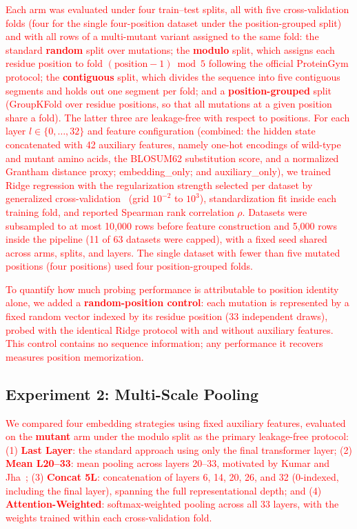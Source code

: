 \documentclass[numbered,webpdf,modern,large]{oup-authoring-template}
\newcommand{\rev}[1]{\textcolor{red}{#1}}
\begin{document}
\rev{Each arm was evaluated under four train--test splits, all with five
cross-validation folds (four for the single four-position dataset under the
position-grouped split) and with all rows of a multi-mutant variant assigned to the
same fold: the standard \textbf{random} split over mutations; the \textbf{modulo}
split, which assigns each residue position to fold $(\text{position} - 1) \bmod 5$
following the official ProteinGym protocol; the \textbf{contiguous} split, which
divides the sequence into five contiguous segments and holds out one segment per
fold; and a \textbf{position-grouped} split (GroupKFold over residue positions, so
that all mutations at a given position share a fold). The latter three are
leakage-free with respect to positions. For each layer $l \in \{0,\dots,32\}$ and
feature configuration (combined: the hidden state concatenated with 42 auxiliary
features, namely one-hot encodings of wild-type and mutant amino acids, the BLOSUM62
substitution score, and a normalized Grantham distance proxy; embedding\_only; and
auxiliary\_only), we trained Ridge regression with the regularization strength
selected per dataset by generalized cross-validation~\cite{golub1979generalized}
(grid $10^{-2}$ to $10^{3}$), standardization fit inside each training fold, and
reported Spearman rank correlation $\rho$. Datasets were subsampled to at most 10,000
rows before feature construction and 5,000 rows inside the pipeline (11 of 63 datasets
were capped), with a fixed seed shared across arms, splits, and layers. The single
dataset with fewer than five mutated positions (four positions) used four
position-grouped folds.}

\rev{To quantify how much probing performance is attributable to position identity
alone, we added a \textbf{random-position control}: each mutation is represented by a
fixed random vector indexed by its residue position (33 independent draws), probed with
the identical Ridge protocol with and without auxiliary features. This control contains
no sequence information; any performance it recovers measures position memorization.}

\subsection{Experiment 2: Multi-Scale Pooling}

\rev{We compared four embedding strategies using fixed auxiliary features,
evaluated on the \textbf{mutant} arm under the modulo split as the primary
leakage-free protocol: (1) \textbf{Last Layer}: the standard approach using only the
final transformer layer;
(2) \textbf{Mean L20--33}: mean pooling across layers 20--33, motivated by
Kumar and Jha~\cite{kumar2025};
(3) \textbf{Concat 5L}: concatenation of layers 6, 14, 20, 26, and 32 (0-indexed,
including the final layer), spanning the full representational depth; and
(4) \textbf{Attention-Weighted}: softmax-weighted pooling across all 33 layers, with
the weights trained within each cross-validation fold.}
\end{document}
